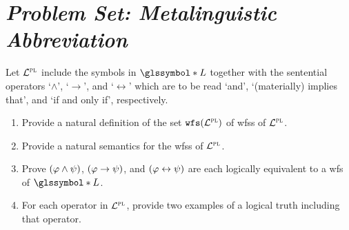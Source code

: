 \documentclass[a4paper, 11pt]{article} %
\newcommand{\g}{\glssymbol*}%
\begin{document}
\section*{\it Problem Set: Metalinguistic Abbreviation}

Let $\mathcal{L}^{\textsc{pl}}$ include the symbols in $\g{L}$ together with the sentential operators `$\wedge$', `$\rightarrow$', and `$\leftrightarrow$' which are to be read `and', `(materially) implies that', and `if and only if', respectively.
\begin{enumerate}[leftmargin=.32in,labelsep=.15in,label=(\arabic*)]\small
  \item Provide a natural definition of the set $\texttt{wfs}(\mathcal{L}^{\textsc{pl}})$ of wfss of $\mathcal{L}^{\textsc{pl}}$.
  \item Provide a natural semantics for the wfss of $\mathcal{L}^{\textsc{pl}}$.
  \item Prove $(\varphi\wedge \psi)$, $(\varphi\rightarrow \psi)$, and $(\varphi\leftrightarrow \psi)$ are each logically equivalent to a wfs of $\g{L}$.
  \item For each operator in $\mathcal{L}^{\textsc{pl}}$, provide two examples of a logical truth including that operator. 
\end{enumerate}

\end{document}
